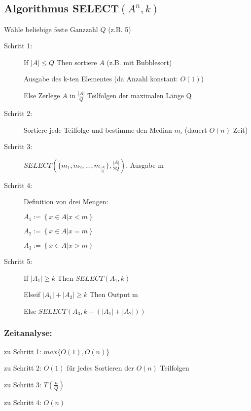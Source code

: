 \documentclass[ngerman,draft,parskip=half*,twoside]{scrreprt}
\theoremstyle{break}
\begin{document}
 \subsection{Algorithmus \texorpdfstring{SELECT$(A^{n},k)$}{SELECT (An,k)}}
 Wähle beliebige feste Ganzzahl $Q$ (z.B. 5)
 \begin{description}
  \item[Schritt 1:] 
  
  If $\left|A\right|\leq Q$ Then sortiere $A$ \hfill(z.B. mit Bubblesort)

  \hspace{2cm}Ausgabe des k-ten Elementes \hfill(da Anzahl konstant: $O(1)$)

  \hspace{1cm}Else Zerlege $A$ in $\frac{\left|A\right|}{Q}$ Teilfolgen der maximalen Länge Q
  \item[Schritt 2:] Sortiere jede Teilfolge und bestimme den Median $m_{i}$ \hfill(dauert $O(n)$ Zeit)
  \item[Schritt 3:] $SELECT(\{m_{1}, m_{2}, ... , m_{\frac{\left|A\right|}{Q}}\},\frac{\left|A\right|}{2Q})$, Ausgabe m
  \item[Schritt 4:] Definition von drei Mengen:

  $A_{1}:=\left\{x\in A|x<m\right\}$

  $A_{2}:=\left\{x\in A|x=m\right\}$

  $A_{3}:=\left\{x\in A|x>m\right\}$
  \item[Schritt 5:] If $\left|A_{1}\right|\geq k$ Then $SELECT (A_{1},k)$

  \hspace{1cm}Elseif $\left|A_{1}\right|+\left|A_{2}\right|\geq k$ Then Output m

  \hspace{1cm}Else $SELECT (A_{3},k-(\left|A_{1}\right|+\left|A_{2}\right|))$
 \end{description}
 
  \subsubsection{Zeitanalyse:}
 \hspace{4mm}zu Schritt 1: $max\{O(1),O(n)\}$

 zu Schritt 2: $O(1)$ für jedes Sortieren der $O(n)$ Teilfolgen

 zu Schritt 3: $T(\frac{n}{Q})$

 zu Schritt 4: $O(n)$
\end{document}
